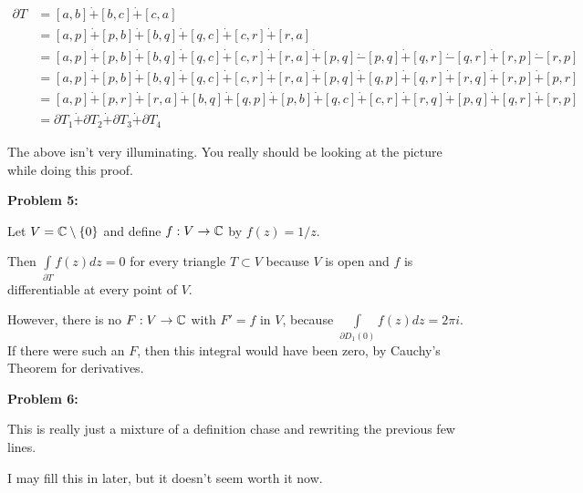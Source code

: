 \documentclass[a4paper,12pt]{article}
\begin{document}
\begin{align*}
\partial T &= [a,b] \dot{+} [b,c] \dot{+} [c,a] \\
&= [a,p] \dot{+} [p,b] \dot{+} [b,q] \dot{+} [q,c] \dot{+} [c,r] \dot{+} [r,a]\\
&= [a,p] \dot{+} [p,b] \dot{+} [b,q] \dot{+} [q,c] \dot{+} [c,r] \dot{+} [r,a] \dot{+}[p,q] \dot{-} [p,q]\dot{+}[q,r] \dot{-} [q,r]\dot{+}[r,p] \dot{-} [r,p]\\
&= [a,p] \dot{+} [p,b] \dot{+} [b,q] \dot{+} [q,c] \dot{+} [c,r] \dot{+} [r,a] \dot{+}[p,q] \dot{+} [q,p]\dot{+}[q,r] \dot{+} [r,q]\dot{+}[r,p] \dot{+} [p,r]\\
&= [a,p] \dot{+} [p,r]\dot{+} [r,a] \dot{+} [b,q] \dot{+} [q,p] \dot{+} [p,b]  \dot{+} [q,c] \dot{+} [c,r] \dot{+} [r,q] \dot{+}[p,q] \dot{+}[q,r] \dot{+}[r,p] \\
&= \partial T_1 \dot{+} \partial T_2 \dot{+} \partial T_3 \dot{+} \partial T_4
\end{align*}

The above isn't very illuminating. You really should be looking at the picture while doing this proof.

\shunt

{\bf Problem 5:}

Let $V = \mathbb{C} \setminus \{0\}$ and define $f: V \to \mathbb{C}$ by $f(z) = 1/z$.

Then $\int\limits_{\partial T} f(z) dz = 0$ for every triangle $T \subset V$ because $V$ is open and $f$ is differentiable at every point of $V$.

However, there is no $F: V \to \mathbb{C}$ with $F' = f$ in $V$, because $\int\limits_{\partial D_1(0)} f(z) dz = 2 \pi i$. If there were such an $F$, then this integral would have been zero, by Cauchy's Theorem for derivatives.

\shunt

{\bf Problem 6:}

This is really just a mixture of a definition chase and rewriting the previous few lines.

I may fill this in later, but it doesn't seem worth it now.

\shunt
\end{document}
